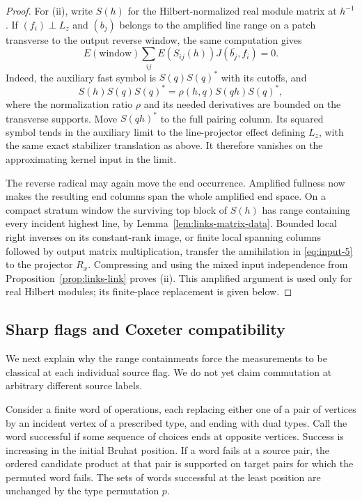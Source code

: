 \begin{proof}
For \textup{(ii)}, write $S(h)$ for the Hilbert-normalized real module
matrix at $h^{-1}$. If $(f_i)\perp L_z$ and $(b_j)$ belongs to the
amplified line range on a patch transverse to the output reverse
window, the same computation gives
\begin{equation}
 E(\mathrm{window})\sum_{ij}E(S_{ij}(h))J(\overline{b_j},f_i)=0.
 \label{eq:input-5}
\end{equation}
Indeed, the auxiliary fast symbol is $S(q)S(q)^*$ with its cutoffs,
and
\[
 S(h)S(q)S(q)^*=\rho(h,q)S(qh)S(q)^*,
\]
where the normalization ratio $\rho$ and its needed derivatives are
bounded on the transverse supports. Move $S(qh)^*$ to the full
pairing column. Its squared symbol tends in the auxiliary limit to
the line-projector effect defining $L_z$, with the same exact
stabilizer translation as above. It therefore vanishes on the
approximating kernel input in the limit.

The reverse radical may again move the end occurrence. Amplified
fullness now makes the resulting end columns span the whole amplified
end space. On a compact stratum window the surviving top block of
$S(h)$ has range containing every incident highest line, by
Lemma~\ref{lem:links-matrix-data}. Bounded local right inverses on its
constant-rank image, or finite local spanning columns followed by
output matrix multiplication, transfer the annihilation in
\eqref{eq:input-5} to the projector $R_x$. Compressing and using the
mixed input independence from Proposition~\ref{prop:links-link}
proves \textup{(ii)}. This amplified argument is used only for real
Hilbert modules; its finite-place replacement is given below.
\end{proof}

\subsection{Sharp flags and Coxeter compatibility}

We next explain why the range containments force the measurements to
be classical at each individual source flag. We do not yet claim
commutation at arbitrary different source labels.

\begin{lemma}
\label{lem:transfer-incidence-words}
Consider a finite word of operations, each replacing either one of a
pair of vertices by an incident vertex of a prescribed type, and
ending with dual types. Call the word successful if some sequence of
choices ends at opposite vertices. Success is increasing in the
initial Bruhat position. If a word fails at a source pair, the ordered
candidate product at that pair is supported on target pairs for
which the permuted word fails. The sets of words successful at the
least position are unchanged by the type permutation $p$.
\end{lemma}

